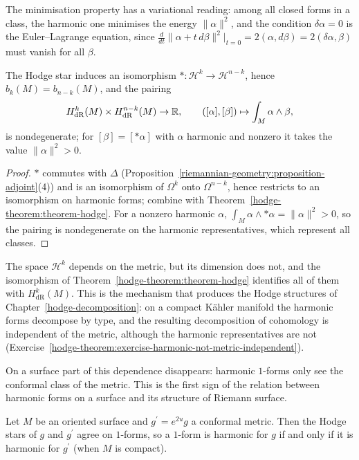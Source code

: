 The minimisation property has a variational reading: among all closed forms in a class, the harmonic one minimises the energy $\|\alpha\|^2$, and the condition $\delta\alpha = 0$ is the
Euler--Lagrange equation, since $\frac{d}{dt}\|\alpha + t\,d\beta\|^2\big|_{t=0} = 2(\alpha, d\beta) = 2(\delta\alpha, \beta)$ must vanish for all $\beta$.

\begin{corollary}\label{hodge-theorem:corollary-poincare-duality}
The Hodge star induces an isomorphism $* \colon \mathcal{H}^k \to \mathcal{H}^{n-k}$, hence $b_k(M) = b_{n-k}(M)$, and the pairing
\[
H^k_{\mathrm{dR}}(M) \times H^{n-k}_{\mathrm{dR}}(M) \to \mathbb{R}, \qquad ([\alpha], [\beta]) \mapsto \int_M\alpha \wedge \beta,
\]
is nondegenerate; for $[\beta] = [*\alpha]$ with $\alpha$ harmonic and nonzero it takes the value $\|\alpha\|^2 > 0$.
\end{corollary}

\begin{proof}
$*$ commutes with $\Delta$ (Proposition~\ref{riemannian-geometry:proposition-adjoint}(4)) and is an isomorphism of $\Omega^k$ onto $\Omega^{n-k}$, hence restricts to an isomorphism on harmonic forms; combine
with Theorem~\ref{hodge-theorem:theorem-hodge}. For a nonzero harmonic $\alpha$, $\int_M\alpha \wedge *\alpha = \|\alpha\|^2 > 0$, so the pairing is nondegenerate on the harmonic representatives, which represent
all classes.
\end{proof}

\begin{remark}\label{hodge-theorem:remark-dependence-on-metric}
The space $\mathcal{H}^k$ depends on the metric, but its dimension does not, and the isomorphism of Theorem~\ref{hodge-theorem:theorem-hodge} identifies all of them with $H^k_{\mathrm{dR}}(M)$. This is the
mechanism that produces the Hodge structures of Chapter~\ref{hodge-decomposition}: on a compact K\"ahler manifold the harmonic forms decompose by type, and the resulting decomposition of cohomology is
independent of the metric, although the harmonic representatives are not (Exercise~\ref{hodge-theorem:exercise-harmonic-not-metric-independent}).
\end{remark}

On a surface part of this dependence disappears: harmonic $1$-forms only see the conformal class of the metric. This is the first sign of the relation between harmonic forms on a surface and its
structure of Riemann surface.

\begin{proposition}\label{hodge-theorem:proposition-conformal-invariance}
Let $M$ be an oriented surface and $g^{\prime} = e^{2u}g$ a conformal metric. Then the Hodge stars of $g$ and $g^{\prime}$ agree on $1$-forms, so a $1$-form is harmonic for $g$ if and only if it is harmonic
for $g^{\prime}$ (when $M$ is compact).
\end{proposition}

